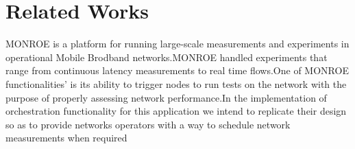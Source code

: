\section{Related Works}
MONROE is a platform for running large-scale measurements and experiments in operational Mobile Brodband networks.MONROE handled experiments that range from continuous latency measurements to real time flows.One of MONROE functionalities' is its ability to trigger nodes to run tests on the network
with the purpose of properly assessing network performance.In the implementation of orchestration functionality for this application we intend to replicate their design so as to provide networks operators with a way to schedule network measurements when required %